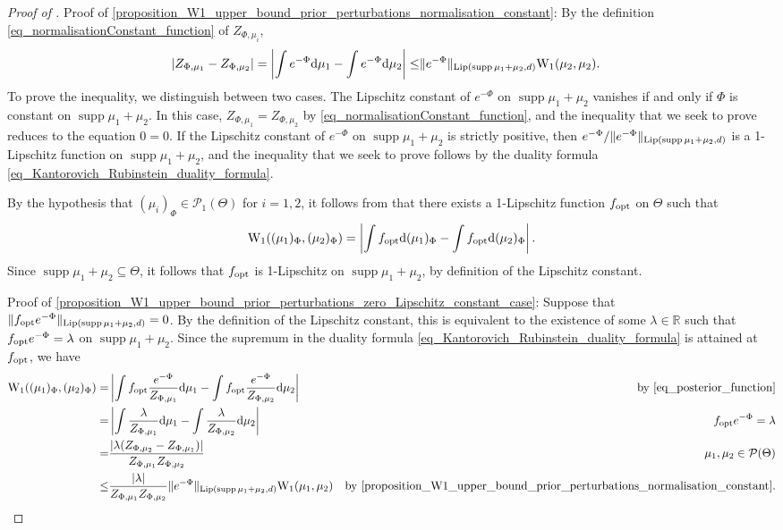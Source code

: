 \documentclass[a4paper]{scrartcl}
\theoremstyle{definition}
\numberwithin{equation}{section}
\newcommand{\R}{\mathbb{R}}
\newcommand{\rd}{\mathrm{d}}
\DeclareMathOperator{\supp}{supp}
\newcommand{\abs}[1]{\vert #1\vert}
\newcommand{\Abs}[1]{\left\vert#1\right\vert}
\newcommand{\norm}[1]{\Vert #1 \Vert}
\newcommand{\Lip}[0]{\textup{Lip}}
\newcommand{\Was}[0]{\textup{W}}
\newcommand{\opt}[0]{\textup{opt}}
\begin{document}
\WassersteinUpperboundPriorperturbations*
\begin{proof}[Proof of ]
Proof of \cref{proposition_W1_upper_bound_prior_perturbations_normalisation_constant}:  
  By the definition \eqref{eq_normalisationConstant_function} of $Z_{\Phi,\mu_i}$,
 \begin{align*}
  \abs{Z_{\Phi,\mu_1}-Z_{\Phi,\mu_2}}=\Abs{ \int e^{-\Phi}\rd \mu_1-\int e^{-\Phi}\rd \mu_2}\leq & \norm{e^{-\Phi}}_{\Lip(\supp{\mu_1+\mu_2},d)} \Was_1(\mu_2,\mu_2).
 \end{align*}
To prove the inequality, we distinguish between two cases.
The Lipschitz constant of $e^{-\Phi}$ on $\supp{\mu_1+\mu_2}$ vanishes if and only if $\Phi$ is constant on $\supp{\mu_1+\mu_2}$.
In this case, $Z_{\Phi,\mu_1}=Z_{\Phi,\mu_2}$ by \eqref{eq_normalisationConstant_function}, and the inequality that we seek to prove reduces to the equation $0=0$.
If the Lipschitz constant of $e^{-\Phi}$ on $\supp{\mu_1+\mu_2}$ is strictly positive, then $e^{-\Phi}/\norm{e^{-\Phi}}_{\Lip(\supp{\mu_1+\mu_2},d)}$ is a 1-Lipschitz function on $\supp{\mu_1+\mu_2}$, and the inequality that we seek to prove follows by the duality formula \eqref{eq_Kantorovich_Rubinstein_duality_formula}. 

By the hypothesis that $(\mu_i)_\Phi\in\mathcal{P}_1(\Theta)$ for $i=1,2$, it follows from  that there exists a 1-Lipschitz function $f_\opt$ on $\Theta$ such that 
\begin{equation*}
 \Was_1((\mu_1)_\Phi,(\mu_2)_\Phi)=\Abs{\int f_\opt \rd (\mu_1)_\Phi-\int f_\opt \rd (\mu_2)_\Phi}.
\end{equation*}
Since $\supp{\mu_1+\mu_2}\subseteq\Theta$, it follows that $f_\opt$ is 1-Lipschitz on $\supp{\mu_1+\mu_2}$, by definition of the Lipschitz constant.
 
 Proof of \cref{proposition_W1_upper_bound_prior_perturbations_zero_Lipschitz_constant_case}: Suppose that $\norm{f_\opt e^{-\Phi}}_{\Lip(\supp{\mu_1+\mu_2},d)}=0$. 
 By the definition of the Lipschitz constant, this is equivalent to the existence of some $\lambda\in\R$ such that $f_\opt e^{-\Phi}=\lambda$ on $\supp{\mu_1+\mu_2}$.
 Since the supremum in the duality formula \eqref{eq_Kantorovich_Rubinstein_duality_formula} is attained at $f_\opt$, we have
 \begin{align*}
  \Was_1((\mu_1)_\Phi,(\mu_2)_\Phi)=&\Abs{\int f_\opt \frac{e^{-\Phi}}{Z_{\Phi,\mu_1}} \rd \mu_1 -\int f_\opt \frac{e^{-\Phi}}{Z_{\Phi,\mu_2}} \rd \mu_2} & \text{by \eqref{eq_posterior_function}}
  \\
  =&\Abs{ \int  \frac{\lambda}{Z_{\Phi,\mu_1}} \rd \mu_1 -\int \frac{\lambda}{Z_{\Phi,\mu_2}} \rd \mu_2} & f_\opt e^{-\Phi}=\lambda
  \\
  =&\frac{\Abs{\lambda(Z_{\Phi,\mu_2}-Z_{\Phi,\mu_1})}}{Z_{\Phi,\mu_1}Z_{\Phi,\mu_2}} & \mu_1,\mu_2\in\mathcal{P}(\Theta)
  \\
  \leq & \frac{\abs{\lambda}}{Z_{\Phi,\mu_1}Z_{\Phi,\mu_2}}\norm{e^{-\Phi}}_{\Lip(\supp{\mu_1+\mu_2},d)}\Was_1(\mu_1,\mu_2) & \text{by \cref{proposition_W1_upper_bound_prior_perturbations_normalisation_constant}.}
\end{align*}


\end{proof}
\end{document}
